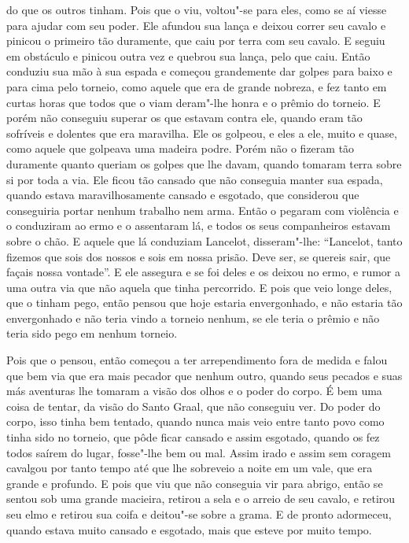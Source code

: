 do que os outros tinham. Pois que o viu, voltou"-se para eles, como se aí viesse
para ajudar com seu poder. Ele afundou sua lança e deixou correr seu cavalo e
pinicou o primeiro tão duramente, que caiu por terra com seu cavalo. E seguiu
em obstáculo e pinicou outra vez e quebrou sua lança, pelo que caiu. Então
conduziu sua mão à sua espada e começou grandemente dar golpes para baixo e para
cima pelo torneio, como aquele que era de grande nobreza, e fez tanto em curtas
horas que todos que o viam deram"-lhe honra e o prêmio do torneio. E porém não
conseguiu superar os que estavam contra ele, quando eram tão sofríveis e
dolentes que era maravilha. Ele os golpeou, e eles a ele, muito e quase, como
aquele que golpeava uma madeira podre. Porém não o fizeram tão duramente quanto
queriam os golpes que lhe davam, quando tomaram terra sobre si por toda a via.
Ele ficou tão cansado que não conseguia manter sua espada, quando estava
maravilhosamente cansado e esgotado, que considerou que conseguiria portar
nenhum trabalho nem arma. Então o pegaram com violência e o conduziram ao ermo
e o assentaram lá, e todos os seus companheiros estavam sobre o chão. E aquele
que lá conduziam Lancelot, disseram"-lhe: “Lancelot, tanto fizemos que sois
dos nossos e sois em nossa prisão. Deve ser, se quereis sair, que façais nossa
vontade”. E ele assegura e se foi deles e os deixou no ermo, e rumor a uma
outra via que não aquela que tinha percorrido. E pois que veio longe deles, que
o tinham pego, então pensou que hoje estaria envergonhado, e não estaria tão
envergonhado e não teria vindo a torneio nenhum, se ele teria o prêmio e não
teria sido pego em nenhum torneio. 

Pois que o pensou, então começou a ter arrependimento fora de medida e falou que
bem via que era mais pecador que nenhum outro, quando seus pecados e suas más
aventuras lhe tomaram a visão dos olhos e o poder do corpo. É bem uma coisa de
tentar, da visão do Santo Graal, que não conseguiu ver. Do poder do corpo, isso
tinha bem tentado, quando nunca mais veio entre tanto povo como tinha sido no
torneio, que pôde ficar cansado e assim esgotado, quando os fez todos saírem do
lugar, fosse"-lhe bem ou mal. Assim irado e assim sem coragem cavalgou por tanto
tempo até que lhe sobreveio a noite em um vale, que era grande e profundo. E
pois que viu que não conseguia vir para abrigo, então se sentou sob uma grande
macieira, retirou a sela e o arreio de seu cavalo, e retirou seu elmo e retirou
sua coifa e deitou"-se sobre a grama. E de pronto adormeceu, quando estava muito
cansado e esgotado, mais que esteve por muito tempo. 

